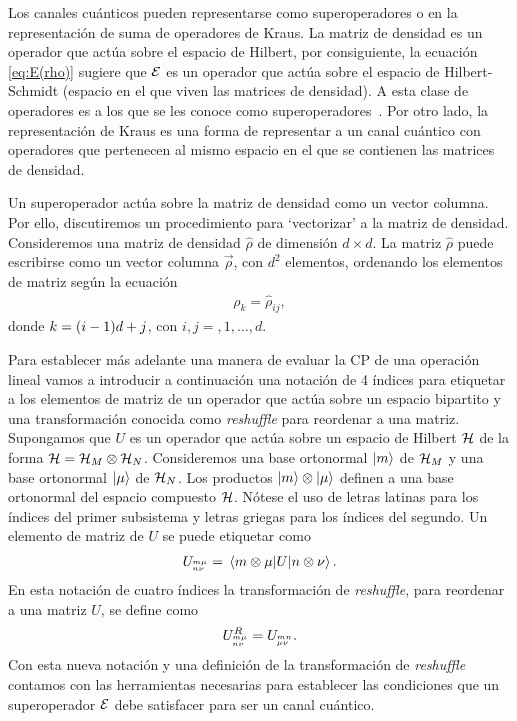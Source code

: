 Los canales cuánticos pueden representarse como superoperadores
o en la representación de suma de operadores de Kraus. 
La matriz de densidad es un operador que actúa sobre el espacio 
de Hilbert, por consiguiente, la ecuación \eqref{eq:E(rho)} 
sugiere que $\mathcal{E}$ es un operador que actúa sobre el espacio 
de Hilbert-Schmidt (espacio en el que viven las matrices de densidad). 
A esta clase de operadores es a los que se les conoce como 
superoperadores~\cite{preskill1998lecture}.
Por otro lado, la representación de Kraus es una forma de 
representar a un canal cuántico con operadores que pertenecen
al mismo espacio en el que se contienen las matrices de densidad.

Un superoperador actúa sobre la matriz de densidad 
como un vector columna. Por ello, discutiremos un procedimiento 
para `vectorizar' a la matriz de densidad.
Consideremos una matriz de densidad $\hat{\rho}$ de dimensión $d\times d$.
La matriz $\hat{\rho}$ puede escribirse como 
un vector columna $\vec{\rho}$, con $d^2$ elementos, 
ordenando los elementos de matriz según la ecuación  
\begin{align}
\rho_k=\hat{\rho}_{ij}, 
\label{eq:matrix-to-vector}
\end{align}
donde $k=\qty(i-1)d+j$, con $i,j=,1,\ldots,d$. 

Para establecer más adelante una manera de evaluar la CP de una operación 
lineal vamos a introducir a continuación una notación de 4 índices para 
etiquetar a los elementos de matriz de un operador que actúa 
sobre un espacio bipartito y una transformación conocida como 
\textit{reshuffle} para reordenar a una matriz. 
Supongamos que $U$ es un operador 
que actúa sobre un espacio de Hilbert 
$\mathcal{H}$ de la forma $\mathcal{H}=\mathcal{H}_M\otimes\mathcal{H}_N$.
Consideremos una base ortonormal $\ket{m}$ de $\mathcal{H}_M$ 
y una base ortonormal $\ket{\mu}$ de $\mathcal{H}_N$. 
Los productos $\ket{m}\otimes\ket{\mu}$ definen a una base
ortonormal del espacio compuesto $\mathcal{H}$. 
Nótese el uso de letras latinas para los índices del
primer subsistema y letras griegas para los índices del segundo. 
Un elemento de matriz de $U$ se puede etiquetar como
\begin{align}
U_\ind{m\mu}{n\nu}=\matrixel{m\otimes \mu}{U}{n\otimes \nu}.
\label{eq:4indices}
\end{align}
En esta notación de cuatro índices la transformación de \textit{reshuffle}, 
para reordenar a una matriz  $U$, se define 
como~\cite{bengtsson_zyczkowski_2017}
\begin{align}
U^R_{{}^{m\mu}_{n\nu}} = U_{{}^{mn}_{\mu\nu}}.
\label{eq:R-4ind}
\end{align}
Con esta nueva notación y una definición de 
la transformación de \textit{reshuffle}
contamos con las herramientas necesarias para establecer 
las condiciones que un superoperador $\mathcal{E}$ debe satisfacer 
para ser un canal cuántico.

